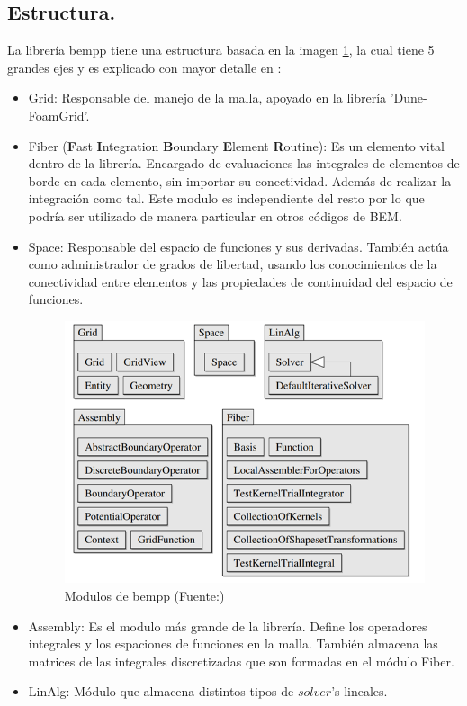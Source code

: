 \documentclass[11pt]{article}
\begin{document}
\subsection{Estructura.}
La librería bempp tiene una estructura basada en la imagen \ref{fig:Estructura BEM}, la cual tiene 5 grandes ejes y es explicado con mayor detalle en \cite{Solvingbempp}:
\begin{itemize}
\item Grid: Responsable del manejo de la malla, apoyado en la librería 'Dune-FoamGrid'.
\item Fiber (\textbf{F}ast \textbf{I}ntegration \textbf{B}oundary \textbf{E}lement \textbf{R}outine): Es un elemento vital dentro de la librería. Encargado de evaluaciones las integrales de elementos de borde en cada elemento, sin importar su conectividad. Además de realizar la integración como tal. Este modulo es independiente del resto por lo que podría ser utilizado de manera particular en otros códigos de BEM.
\item Space: Responsable del espacio de funciones y sus derivadas. También actúa como administrador de grados de libertad, usando los conocimientos de la conectividad entre elementos y las propiedades de continuidad del espacio de funciones.
\begin{figure}[H]
\centering
\includegraphics[scale=0.7]{Imagenes/estructurabempp.png}
\caption{Modulos de bempp (Fuente:\cite{Solvingbempp})}\label{fig:Estructura BEM}
\end{figure}
\item Assembly: Es el modulo más grande de la librería. Define los operadores integrales y los espaciones de funciones en la malla. También almacena las matrices de las integrales discretizadas que son formadas en el módulo Fiber.
\item LinAlg: Módulo que almacena distintos tipos de $solver$'s lineales. 
\end{itemize} 
\end{document}
